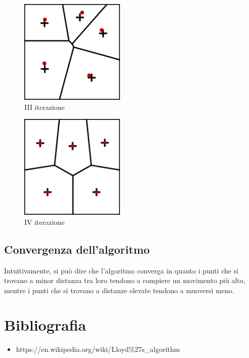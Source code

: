 \documentclass[10pt,a4paper]{article}
\begin{document}
\begin{figure}[H]
\includegraphics[width=5cm]{lloyd_iterazione_3.png}
\centering
\caption{III iterazione}
\end{figure}

\begin{figure}[H]
\includegraphics[width=5cm]{lloyd_iterazione_4.png}
\centering
\caption{IV iterazione}
\end{figure}

\subsection{Convergenza dell'algoritmo}

Intuitivamente, si può dire che l'algoritmo converga in quanto i punti che si trovano a minor distanza tra loro tendono a compiere un movimento più alto, mentre i punti che si trovano a distanze elevate tendono a muoversi meno.


\section*{Bibliografia}

\begin{itemize}
	\item https://en.wikipedia.org/wiki/Lloyd\%27s\_algorithm
\end{itemize}
\end{document}
